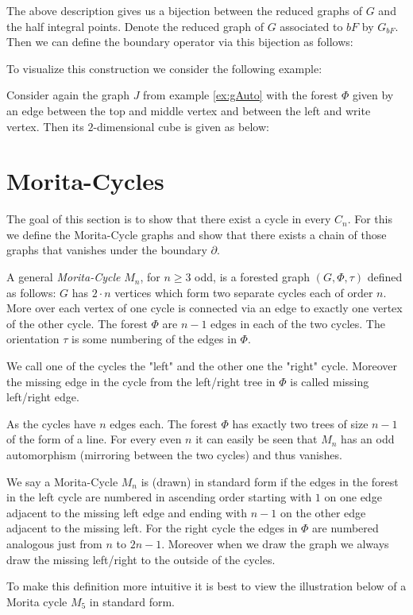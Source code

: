 The above description gives us a bijection between the reduced graphs of $G$ and the half integral points.
Denote the reduced graph of $G$ associated to $bF$ by $G_{bF}$. Then we can define the boundary operator via this bijection as follows:


To visualize this construction we consider the following example:
\begin{eg}
	Consider again the graph $J$ from example \ref{ex:gAuto} with the forest $\Phi$ given by an edge between the top and middle vertex and
	between the left and write vertex.
	Then its $2$-dimensional cube is given as below:
\end{eg}

\section{Morita-Cycles}
The goal of this section is to show that there exist a cycle in every $C_{n}$.
For this we define the Morita-Cycle graphs and show that there exists a chain of those graphs that vanishes under the boundary $\partial$.

 \begin{definition}
	 A general \emph{Morita-Cycle} $M_{n}$, for $n \geq 3$ odd, is a forested graph $(G,\Phi,\tau)$ defined as follows:
	 $G$ has $2\cdot n$ vertices which form two separate cycles each of order $n$.
	 More over each vertex of one cycle is connected via an edge to exactly one vertex of the other cycle.
	 The forest $\Phi$ are $n-1$ edges in each of the two cycles.
	 The orientation $\tau$ is some numbering of the edges in $\Phi$. 

	 We call one of the cycles the "left" and the other one the "right" cycle.
	 Moreover the missing edge in the cycle from the left/right tree in $\Phi$ is called missing left/right edge.
\end{definition}
As the cycles have $n$ edges each. The forest $\Phi$ has exactly two trees of size $n-1$ of the form of a line.
For every even $n$ it can easily be seen that $M_{n}$ has an odd automorphism (mirroring between the two cycles) and thus vanishes.

\begin{definition}
	We say a Morita-Cycle $M_{n}$ is (drawn) in standard form if the edges in the forest in the left cycle are numbered in ascending order
	starting with $1$ on one edge adjacent to the missing left edge and ending with $n-1$ on the other edge adjacent to the missing left.
	For the right cycle the edges in $\Phi$ are numbered analogous just from $n$ to $2n-1$. 
	Moreover when we draw the graph we always draw the missing left/right to the outside of the cycles.

	To make this definition more intuitive it is best to view the illustration below of a Morita cycle $M_{5}$ in standard form.
\end{definition}

